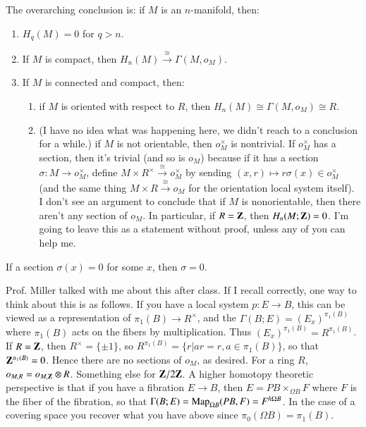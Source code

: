 The overarching conclusion is: if $M$ is an $n$-manifold, then:
\begin{enumerate}
\item $H_q(M)=0$ for $q>n$.
\item If $M$ is compact, then $H_n(M)\xrightarrow{\cong}\Gamma(M,o_M)$.
\item If $M$ is connected and compact, then:
	\begin{enumerate}
	\item if $M$ is oriented with respect to $R$, then $H_n(M)\cong \Gamma(M,o_M)\cong R$.
	\item (I have no idea what was happening here, we didn't reach to a conclusion for a while.) if $M$ is not orientable, then $o_M^\times$ is nontrivial. If $o_M^\times$ has a section, then it's trivial (and so is $o_M$) because if it has a section $\sigma:M\to o^\times_M$, define $M\times R^\times\xrightarrow{\cong} o_M^\times$ by sending $(x,r)\mapsto r\sigma(x)\in o_M^\times$ (and the same thing $M\times R\xrightarrow{\cong} o_M$ for the orientation local system itself). I don't see an argument to conclude that if $M$ is nonorientable, then there aren't any section of $o_M$. In particular, if $R=\mathbf Z$, then $H_n(M;\mathbf Z)=0$. I'm going to leave this as a statement without proof, unless any of you can help me.
	\end{enumerate}
\end{enumerate}
If a section $\sigma(x)=0$ for some $x$, then $\sigma=0$.
\begin{remark}
Prof. Miller talked with me about this after class. If I recall correctly, one way to think about this is as follows. If you have a local system $p:E\to B$, this can be viewed as a representation of $\pi_1(B)\to R^\times$, and the $\Gamma(B;E)=(E_x)^{\pi_1(B)}$ where $\pi_1(B)$ acts on the fibers by multiplication. Thus $(E_x)^{\pi_1(B)}=R^{\pi_1(B)}$. If $R=\mathbf Z$, then $R^\times=\{\pm 1\}$, so $R^{\pi_1(B)}=\{r|ar=r,a\in\pi_1(B)\}$, so that $\mathbf Z^{\pi_1(B)}=0$. Hence there are no sections of $o_M$, as desired. For a ring $R$, $o_{M,R}=o_{M,\mathbf Z}\otimes R$. Something else for $\mathbf Z/2\mathbf Z$. A higher homotopy theoretic perspective is that if you have a fibration $E\to B$, then $E=PB\times_{\Omega B}F$ where $F$ is the fiber of the fibration, so that $\Gamma(B;E)=\operatorname{Map}_{\Omega B}(PB,F)=F^{h\Omega B}$. In the case of a covering space you recover what you have above since $\pi_0(\Omega B)=\pi_1(B)$.
\end{remark}
